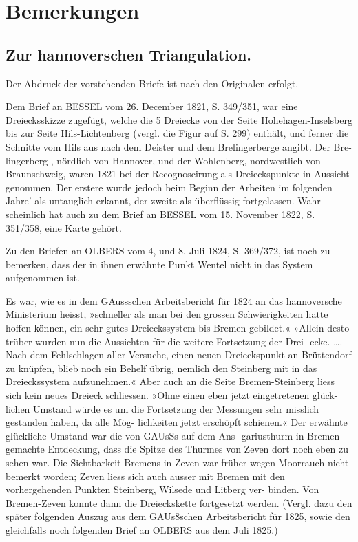 \documentclass[12pt,a4paper]{article}
\theoremstyle{plain}
\theoremstyle{definition}
\theoremstyle{remark}
\begin{document}
\noindent

\section*{Bemerkungen}
\subsection*{Zur hannoverschen Triangulation.}

\noindent

\noindent
Der Abdruck der vorstehenden Briefe ist nach den Originalen erfolgt.

\noindent
Dem Brief an BESSEL vom 26. December 1821, S. 349/351, war eine Dreiecksskizze zugefügt, welche die
5 Dreiecke von der Seite Hohehagen-Inselsberg bis zur Seite Hils-Lichtenberg (vergl. die Figur auf S. 299)
enthält, und ferner die Schnitte vom Hils aus nach dem Deister und dem Brelingerberge angibt. Der Bre-
lingerberg , nördlich von Hannover, und der Wohlenberg, nordwestlich von Braunschweig, waren 1821
bei der Recognoscirung als Dreieckspunkte in Aussicht genommen. Der erstere wurde jedoch beim Beginn
der Arbeiten im folgenden Jahre' als untauglich erkannt, der zweite als überflüssig fortgelassen. Wahr-
scheinlich hat auch zu dem Brief an BESSEL vom 15. November 1822, S. 351/358, eine Karte gehört.

\noindent
Zu den Briefen an OLBERS vom 4, und 8. Juli 1824, S. 369/372, ist noch zu bemerken, dass der in
ihnen erwähnte Punkt Wentel nicht in das System aufgenommen ist.

\noindent
Es war, wie es in dem GAussschen Arbeitsbericht für 1824 an das hannoversche Ministerium heisst,
»schneller als man bei den grossen Schwierigkeiten hatte hoffen können, ein sehr gutes Dreieckssystem bis
Bremen gebildet.« »Allein desto trüber wurden nun die Aussichten für die weitere Fortsetzung der Drei-
ecke. \ldots. Nach dem Fehlschlagen aller Versuche, einen neuen Dreieckspunkt an Brüttendorf zu knüpfen, blieb
noch ein Behelf übrig, nemlich den Steinberg mit in das Dreieckssystem aufzunehmen.« Aber auch an die
Seite Bremen-Steinberg liess sich kein neues Dreieck schliessen. »Ohne einen eben jetzt eingetretenen glück-
lichen Umstand würde es um die Fortsetzung der Messungen sehr misslich gestanden haben, da alle Mög-
lichkeiten jetzt erschöpft schienen.« Der erwähnte glückliche Umstand war die von GAUsSs auf dem Ans-
gariusthurm in Bremen gemachte Entdeckung, dass die Spitze des Thurmes von Zeven dort noch eben zu
sehen war. Die Sichtbarkeit Bremens in Zeven war früher wegen Moorrauch nicht bemerkt worden; Zeven
liess sich auch ausser mit Bremen mit den vorhergehenden Punkten Steinberg, Wilsede und Litberg ver-
binden. Von Bremen-Zeven konnte dann die Dreieckskette fortgesetzt werden. (Vergl. dazu den später
folgenden Auszug aus dem GAUs8schen Arbeitsbericht für 1825, sowie den gleichfalls noch folgenden Brief
an OLBERS aus dem Juli 1825.)
\end{document}
